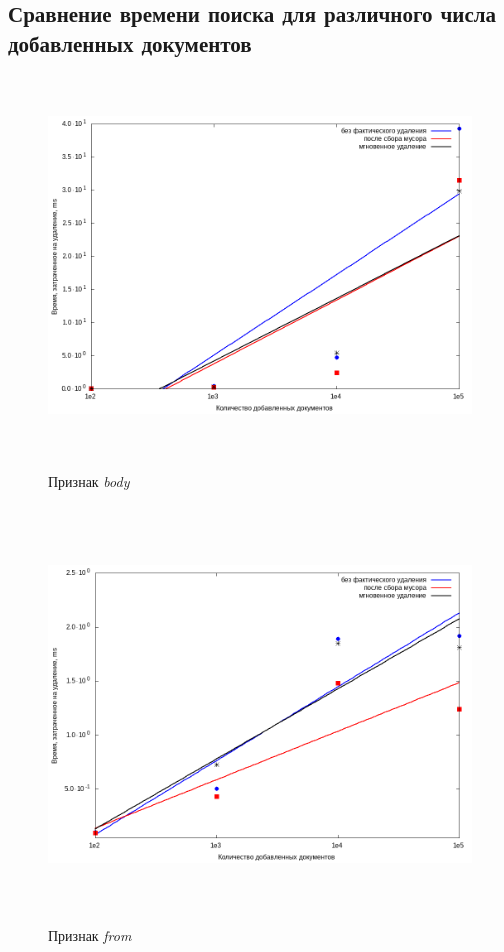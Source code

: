 \subsection{Сравнение времени поиска для различного числа добавленных документов}

\begin{figure}[H]
\includegraphics[width=\linewidth, height=10cm]{fig/body.png}
\caption{Признак \textit{body}}
\includegraphics[width=\linewidth, height=11cm]{fig/from.png}
\caption{Признак \textit{from}}
\end{figure}

